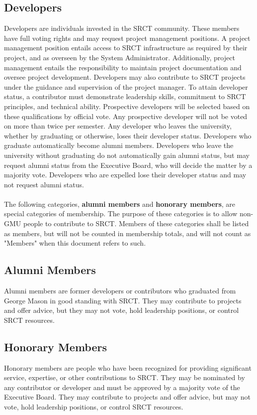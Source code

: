 \documentclass{article}
\begin{document}
  \subsection{Developers}
  Developers are individuals invested in the SRCT community. These 
  members have full voting rights and may request project management 
  positions. A project management position entails access to SRCT 
  infrastructure as required by their project, and as overseen by the
  System Administrator. Additionally, project management entails the
  responsibility to maintain project documentation and oversee project
  development. Developers may also contribute to SRCT projects under 
  the guidance and supervision of the project manager. To attain 
  developer status, a contributor must demonstrate leadership skills, 
  commitment to SRCT principles, and technical ability. Prospective 
  developers will be selected based on these qualifications by official 
  vote. Any prospective developer will not be voted on more than twice 
  per semester.
  Any developer who leaves the university, whether by graduating or otherwise,
  loses their developer status. Developers who graduate automatically become
  alumni members. Developers who leave the university without graduating
  do not automatically gain alumni status, but may request alumni status
  from the Executive Board, who will decide the matter by a majority vote.
  Developers who are expelled lose their developer status and may not request
  alumni status.
  \\ \\
  The following categories, \textbf{alumni members} and
  \textbf{honorary members}, are special categories of membership. The
  purpose of these categories is to allow non-GMU people to contribute to
  SRCT. Members of these categories shall be listed as members, but will
  not be counted in membership totals, and will not count as "Members" when
  this document refers to such.

  \subsection{Alumni Members}
  Alumni members are former developers or contributors who graduated
  from George Mason in good standing with SRCT. They may contribute to
  projects and offer advice, but they may not vote, hold leadership
  positions, or control SRCT resources.

  \subsection{Honorary Members}
  Honorary members are people who have been recognized for providing
  significant service, expertise, or other contributions to SRCT. They
  may be nominated by any contributor or developer and must be approved
  by a majority vote of the Executive Board. They may contribute to projects
  and offer advice, but may not vote, hold leadership positions, or control
  SRCT resources.
  
\end{document}
